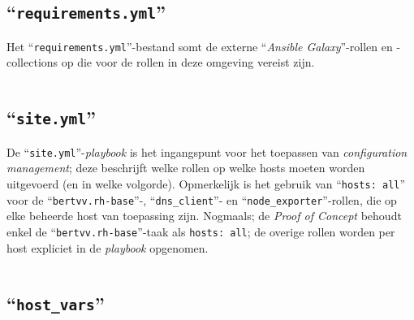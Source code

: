 \subsection{``\texttt{requirements.yml}''}%

Het ``\texttt{requirements.yml}''-bestand somt de externe ``\emph{Ansible Galaxy}''-rollen en -collections op die voor de rollen in deze omgeving vereist zijn.

\begin{codeblock}
    \inputminted{yaml}{../project_files/manual_test_env/ansible/requirements.yml}
    \caption[``\texttt{requirements.yml}'' van de manuele testomgeving]{``\texttt{requirements.yml''} van de manuele testomgeving; externe rollen en collections vereist voor de omgeving.}
    \label{code:requirements.yml}
\end{codeblock}

\subsection{``\texttt{site.yml}''}%

De ``\texttt{site.yml}''-\emph{playbook} is het ingangspunt voor het toepassen van \emph{configuration management}; deze beschrijft welke rollen op welke hosts moeten worden uitgevoerd (en in welke volgorde). Opmerkelijk is het gebruik van ``\texttt{hosts: all}'' voor de ``\texttt{bertvv.rh-base}''-, ``\texttt{dns\_client}''- en ``\texttt{node\_exporter}''-rollen, die op elke beheerde host van toepassing zijn. Nogmaals; de \emph{Proof of Concept} behoudt enkel de ``\texttt{bertvv.rh-base}''-taak als \texttt{hosts: all}; de overige rollen worden per host expliciet in de \emph{playbook} opgenomen.

\begin{codeblockfixed}
    \begin{codeblock}
        \inputminted{yaml}{../project_files/manual_test_env/ansible/site.yml}
        \caption[``\texttt{site.yml}'' van de manuele testomgeving]{``\texttt{site.yml}'' van de manuele testomgeving; het centrale \emph{playbook} dat de rolverdeling per host beschrijft.}
        \label{code:site.yml}
    \end{codeblock}
\end{codeblockfixed}

\subsection{``\texttt{host\_vars}''}%

